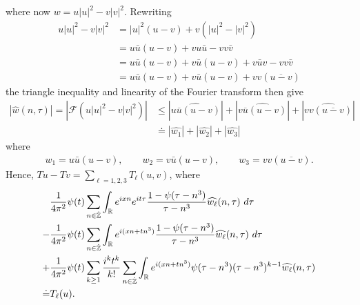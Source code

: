 \documentclass[12pt,reqno]{amsart}
\numberwithin{equation}{section}  %
\numberwithin{figure}{section}
\newcommand{\rr}{\mathbb{R}}
\newcommand{\zz}{\mathbb{Z}}
\newcommand{\zzdot}{\dot{\zz}}
\newcommand{\wh}{\widehat}
\theoremstyle{plain}
\theoremstyle{definition}
\theoremstyle{remark}
\begin{document}
%
where now $w = u | u |^2 - v | v |^{2}$. Rewriting
%
\begin{equation*}
	\begin{split}
		u | u |^{2} - v | v |^{2}
		& = | u |^2 \left( u -v \right) + v\left( | u 
		|^2 - | v |^2
		\right)
		\\
		& = u \bar u \left( u -v \right) + v u \bar u - v v \bar v
		\\
		& = u \bar u \left( u - v \right) + v \bar u\left( u - v \right) + v 
		\bar u v - v v \bar v
		\\
		& = u \bar u \left( u -v \right) + v \bar u\left( u - v \right) + v v 
		\left( \overline{u -v} \right)
	\end{split}
\end{equation*}
%
the triangle inequality and linearity of the Fourier transform then give
%
\begin{equation*}
	\begin{split}
		| \wh{w}(n, \tau) | = | \mathcal{F}(u | u |^2 - v| v |^2) |
		& \le | \wh{u \overline{u} \left (u -v \right )} | +
		| \wh{v \overline{u} (u -v)} | + |\wh{v v 
		(\overline{u-v})}|
		\\
		& \doteq | \wh{w_1} | + | \wh{w_2} | + | \wh{w_3} |
	\end{split}
\end{equation*}
%
where
%
\begin{equation*}
	\begin{split}
		w_1 = u \bar u \left( u -v \right), \qquad w_2 = v \bar u \left( u -v 
		\right), \qquad w_3 = v v \left( \overline{u -v} \right).
	\end{split}
\end{equation*}
%
Hence, $Tu - Tv = \sum_{\ell=1, 2, 3} 
T_\ell(u, v)$, where
\begin{align}
	\label{main-int-exp-mod1}
	& \frac{1}{4 \pi^2} \psi(t) \sum_{n\in \zzdot} \int_\rr e^{ixn}  
		e^{it \tau} \frac{ 1 - \psi(\tau - n^{3}) 
		}{\tau - n^{3}} \wh{w_\ell}(n, \tau) \ d \tau
		\\
		\label{main-int-exp-mod2}
		- & \frac{1}{4 \pi^2} \psi(t) \sum_{n\in \zzdot} \int_\rr e^{i(xn + 
		tn^{3})}
		 \frac{1- \psi(\tau - n^{3})}{\tau - n^{3}} \wh{w_\ell}(n, \tau) \ d \tau
		\\
		\label{main-int-exp-mod3}
		+ & \frac{1}{4 \pi^2} \psi(t) \sum_{k \ge 1} \frac{i^k t^k}{k!}
		\sum_{n \in \zzdot} \int_\rr e^{i(xn + tn^{3} )}
		\psi(\tau - n^{3}) (\tau - n^{3})^{k-1} \wh{w_\ell}(n, \tau)  
		\\
		\doteq & T_\ell(u). \notag
\end{align}
\end{document}
